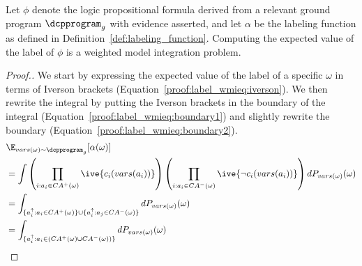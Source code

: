\begin{lemma} \label{lemma:expt_label2wmi}
Let $\phi$ denote the logic propositional formula derived from a relevant ground program $\dcpprogram_g$ with evidence asserted, and let $\alpha$ be the labeling function as defined in Definition~\ref{def:labeling_function}. Computing the expected value of the label of $\phi$ is a weighted model integration problem.
\end{lemma}
\begin{proof}[Proof.] We start by expressing the expected value of the label of a specific $\omega$ in terms of Iverson brackets (Equation~\ref{proof:label_wmieq:iverson}). We then rewrite the integral by putting the Iverson brackets in the boundary of the integral (Equation~\ref{proof:label_wmieq:boundary1}) and slightly rewrite the boundary (Equation~\ref{proof:label_wmieq:boundary2}).
\begin{align}
    &\E_{vars(\omega) \sim  \dcpprogram_g} [\alpha( \omega )] \nonumber \\
    &=
    \int
        \left( \prod_{i: a_i \in CA^+(\omega)} \ive{  c_i(vars(a_i)) } \right)
        \left( \prod_{i: a_i \in CA^-(\omega)} \ive{  \neg c_i(vars(a_i)) } \right) 
    dP_{vars(\omega)}(\omega) \label{proof:label_wmieq:iverson} \\
    &= \int_{\{ a_i^\uparrow: a_i \in CA^+(\omega) \} \cup \{a_i^\uparrow : a_j \in CA^-(\omega)\} }     dP_{vars(\omega)}(\omega)   \label{proof:label_wmieq:boundary1} \\
    &= \int_{ \{  a_i^\uparrow : a_i \in ( CA^+(\omega) \cup CA^-(\omega) )   \} } dP_{vars(\omega)}(\omega)  \label{proof:label_wmieq:boundary2}
\end{align}



\end{proof}
